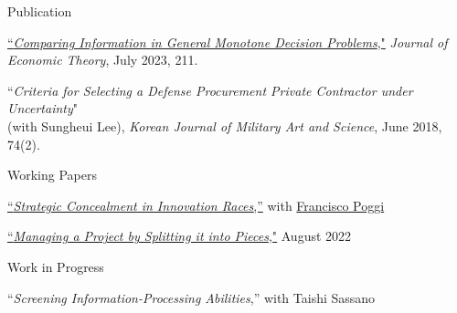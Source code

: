 \begin{rSection}{Publication}
	
	\begin{etaremune}
		\item \href{https://yonggyun-yg-kim.github.io/files/Research%20papers/GMDP_JET.pdf}{``\textit{Comparing Information in General Monotone Decision Problems},"} 
		\textit{Journal of Economic Theory}, July 2023, 211. 
		
		\item 
		``\textit{Criteria for Selecting a Defense Procurement Private Contractor under Uncertainty}"\\
		(with Sungheui Lee), \textit{Korean Journal of Military Art and Science}, June 2018, 74(2). 
	\end{etaremune}
	
	
	
\end{rSection}

\begin{rSection}{Working Papers}
	
	\begin{etaremune}
		
		\item \href{https://yonggyun-yg-kim.github.io/files/Research%20papers/SCIR_public.pdf}{``\textit{Strategic Concealment in Innovation Races},''}   with \href{https://www.franciscopoggi.com/}{Francisco Poggi}
		
		\item \href{https://ssrn.com/abstract=3450802}{``\textit{Managing a Project by Splitting it into Pieces},"} August 2022	

	\end{etaremune}
	
	
\end{rSection}


\begin{rSection}{Work in Progress}
	\begin{etaremune}

		\item 	``\textit{Screening Information-Processing Abilities},'' with Taishi Sassano

	\end{etaremune}
\end{rSection}



